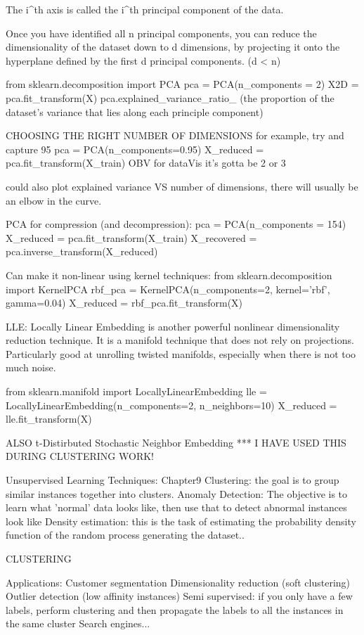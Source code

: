 The i^th axis is called the i^th principal component of the data.

Once you have identified all n principal components,
you can reduce the dimensionality of the dataset down to d dimensions,
by projecting it onto the hyperplane defined by the first d principal components. (d < n)

from sklearn.decomposition import PCA
pca = PCA(n_components = 2)
X2D = pca.fit_transform(X)
pca.explained_variance_ratio_ (the proportion of the dataset's variance that lies along each principle component)

CHOOSING THE RIGHT NUMBER OF DIMENSIONS
for example, try and capture 95%
pca = PCA(n_components=0.95)
X_reduced = pca.fit_transform(X_train)
OBV for dataVis it's gotta be 2 or 3

could also plot explained variance VS number of dimensions,
there will usually be an elbow in the curve.

PCA for compression (and decompression):
pca = PCA(n_components = 154)
X_reduced = pca.fit_transform(X_train)
X_recovered = pca.inverse_transform(X_reduced)

Can make it non-linear using kernel techniques:
from sklearn.decomposition import KernelPCA
rbf_pca = KernelPCA(n_components=2, kernel='rbf', gamma=0.04)
X_reduced = rbf_pca.fit_transform(X)

LLE: Locally Linear Embedding
is another powerful nonlinear dimensionality reduction technique.
It is a manifold technique that does not rely on projections.
Particularly good at unrolling twisted manifolds, especially when there is not too much noise.

from sklearn.manifold import LocallyLinearEmbedding
lle = LocallyLinearEmbedding(n_components=2, n_neighbors=10)
X_reduced = lle.fit_transform(X)

ALSO t-Distirbuted Stochastic Neighbor Embedding
*** I HAVE USED THIS DURING CLUSTERING WORK!





Unsupervised Learning Techniques: Chapter9
Clustering: the goal is to group similar instances together into clusters.
Anomaly Detection: The objective is to learn what 'normal' data looks like,
then use that to detect abnormal instances look like
Density estimation: this is the task of estimating the probability density function of the random process generating the dataset..

CLUSTERING

Applications:
Customer segmentation
Dimensionality reduction (soft clustering)
Outlier detection (low affinity instances)
Semi supervised: if you only have a few labels, perform clustering and then propagate the labels to all the instances in the same cluster
Search engines...

